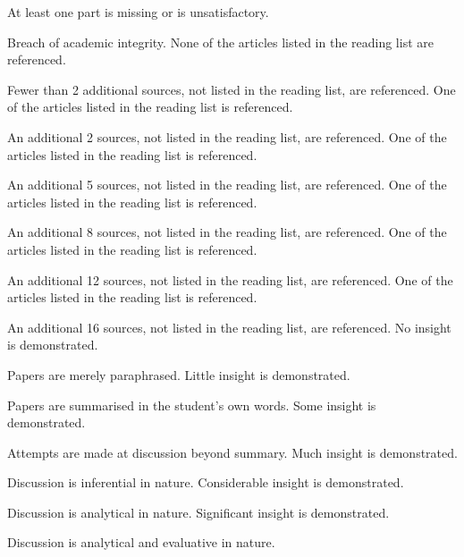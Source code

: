\documentclass{../../fal_assignment}
\begin{document}
\begin{markingrubric}
%
		\grade\fail At least one part is missing or is unsatisfactory.
        \par Breach of academic integrity.
%
        \grade\fail	None of the articles listed in the reading list are referenced.
        \par		Fewer than 2 additional sources, not listed in the reading list, are referenced.
        \grade		One of the articles listed in the reading list is referenced.
        \par		An additional 2 sources, not listed in the reading list, are referenced.
        \grade		One of the articles listed in the reading list is referenced.
        \par		An additional 5 sources, not listed in the reading list, are referenced.
        \grade		One of the articles listed in the reading list is referenced.
        \par		An additional 8 sources, not listed in the reading list, are referenced.
        \grade		One of the articles listed in the reading list is referenced.
        \par		An additional 12 sources, not listed in the reading list, are referenced.
        \grade		One of the articles listed in the reading list is referenced.
        \par		An additional 16 sources, not listed in the reading list, are referenced.
%
        \grade\fail No insight is demonstrated.
        \par		Papers are merely paraphrased.
        \grade		Little insight is demonstrated.
        \par		Papers are summarised in the student's own words.
        \grade		Some insight is demonstrated.
        \par		Attempts are made at discussion beyond summary.
        \grade		Much insight is demonstrated.
        \par		Discussion is inferential in nature.
        \grade		Considerable insight is demonstrated.
        \par		Discussion is analytical in nature.
        \grade		Significant insight is demonstrated.
        \par		Discussion is analytical and evaluative in nature.
%

\end{markingrubric}
\end{document}

